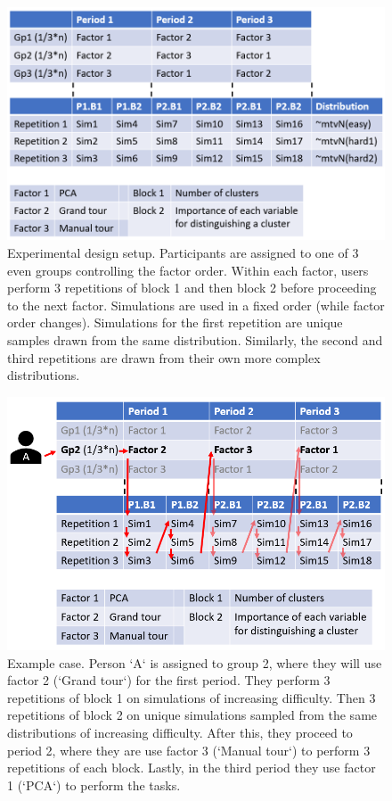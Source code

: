 \documentclass[]{article}
\begin{document}
\begin{figure}

{\centering \includegraphics[width=1\linewidth]{./figures/experimental_design} 

}

\caption{Experimental design setup. Participants are assigned to one of 3 even groups controlling the factor order. Within each factor, users perform 3 repetitions of block 1 and then block 2 before proceeding to the next factor. Simulations are used in a fixed order (while factor order changes). Simulations for the first repetition are unique samples drawn from the same distribution. Similarly, the second and third repetitions are drawn from their own more complex distributions.}\label{fig:design}
\end{figure}

\begin{figure}

{\centering \includegraphics[width=1\linewidth]{./figures/experimental_design_personA} 

}

\caption{Example case. Person `A` is assigned to group 2, where they will use factor 2 (`Grand tour`) for the first period. They perform 3 repetitions of block 1 on simulations of increasing difficulty. Then 3 repetitions of block 2 on unique simulations sampled from the same distributions of increasing difficulty. After this, they proceed to period 2, where they are use factor 3 (`Manual tour`) to perform 3 repetitions of each block. Lastly, in the third period they use factor 1 (`PCA`) to perform the tasks.}\label{fig:designExample}
\end{figure}
\end{document}
